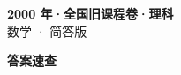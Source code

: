 \documentclass[zihao=-4, a4paper]{ctexart}
\begin{document}
\begin{center}
  {\Large\bfseries 2000 年·全国旧课程卷·理科}\\[4pt]
  {\large 数学 · 简答版}
\end{center}
\medskip
{}

\clearpage
{}
\begin{center}{\Large\bfseries 答案速查}\end{center}
\medskip

\end{document}
